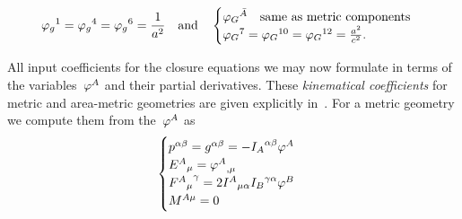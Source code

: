 \begin{equation}\label{eq:geomdof_cosmo}
	{\varphi_g}^1={\varphi_g}^4={\varphi_g}^6=\frac{1}{a^2} \quad \text{and} \quad \begin{cases}
		{\varphi_G}^{\bar{A}} \quad \text{same as metric components}\\
		{\varphi_G}^7={\varphi_G}^{10}={\varphi_G}^{12}=\frac{a^2}{c^2}
	\mathpunct{.}
	\end{cases}
\end{equation}


All input coefficients for the closure equations we may now formulate in terms of the variables~$\varphi^A$ and their partial derivatives. These \emph{kinematical coefficients} for metric and area-metric geometries are given explicitly in~\autocite{Schuller2016}. For a metric geometry we compute them from the~$\varphi^A$ as
\begin{equation}
	\begin{cases}
		\pcoeff^{\alpha\beta}=\met^{\alpha\beta}=-\invintertw{A}{\alpha\beta}\geomdof^A \\
		\Ecoeff{A}{\mu}={\geomdof^A}_{,\mu}\\
		\Fcoeff{A}{\gamma}{\mu}=2\intertw{A}{\mu\alpha}\invintertw{B}{\gamma\alpha}\geomdof^B\\
		\Mcoeff{A}{\mu}=0
	\end{cases}%
\end{equation}
